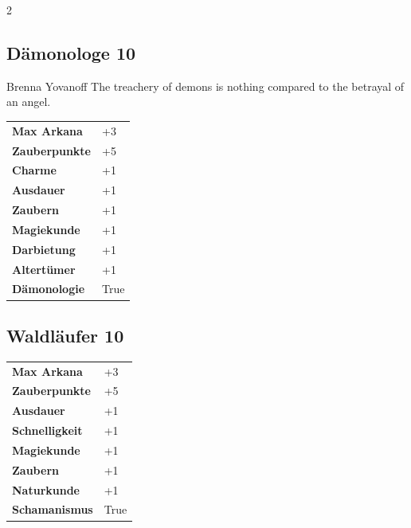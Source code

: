 \begin{multicols}{2}
\begin{tcolorbox}

\end{tcolorbox}

\begin{tcolorbox}
    \subsection*{Dämonologe \hfill \small{10 }}
    \tcblower


\begin{pquote}{Brenna Yovanoff}
The treachery of demons is nothing compared to the betrayal of an angel.
\end{pquote}

\vspace{3mm}

\begin{tabular}{@{}ll@{}}
    \textbf{Max Arkana} & +3\\
    \textbf{Zauberpunkte} & +5\\
    \textbf{Charme} & +1\\
    \textbf{Ausdauer} & +1\\
    \textbf{Zaubern} & +1\\
    \textbf{Magiekunde} & +1\\
    \textbf{Darbietung} & +1\\
    \textbf{Altertümer} & +1\\
    \textbf{Dämonologie} & True\\
\end{tabular}


\end{tcolorbox}

\begin{tcolorbox}
    \subsection*{Waldläufer \hfill \small{10 }}
    \tcblower




\begin{tabular}{@{}ll@{}}
    \textbf{Max Arkana} & +3\\
    \textbf{Zauberpunkte} & +5\\
    \textbf{Ausdauer} & +1\\
    \textbf{Schnelligkeit} & +1\\
    \textbf{Magiekunde} & +1\\
    \textbf{Zaubern} & +1\\
    \textbf{Naturkunde} & +1\\
    \textbf{Schamanismus} & True\\
\end{tabular}


\end{tcolorbox}
\end{multicols}
